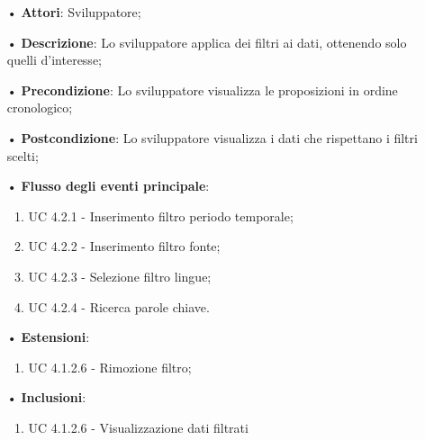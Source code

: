 \begin{itemize}
\item[•]\textbf{Attori}: Sviluppatore;
\item[•]\textbf{Descrizione}: Lo sviluppatore applica dei filtri ai dati, ottenendo solo quelli d'interesse;
\item[•]\textbf{Precondizione}: Lo sviluppatore visualizza le proposizioni in ordine cronologico;
\item[•]\textbf{Postcondizione}: Lo sviluppatore visualizza i dati che rispettano i filtri scelti;
\item[•]\textbf{Flusso degli eventi principale}:
\begin{enumerate}
\item UC 4.2.1 - Inserimento filtro periodo temporale;
\item UC 4.2.2 - Inserimento filtro fonte;
\item UC 4.2.3 - Selezione filtro lingue;
\item UC 4.2.4 - Ricerca parole chiave.
\end{enumerate}
\item[•]\textbf{Estensioni}:
\begin{enumerate}
	\item UC 4.1.2.6 - Rimozione filtro;
\end{enumerate}
\item[•]\textbf{Inclusioni}:
\begin{enumerate}
\item UC 4.1.2.6 - Visualizzazione dati filtrati
\end{enumerate}
\end{itemize}

